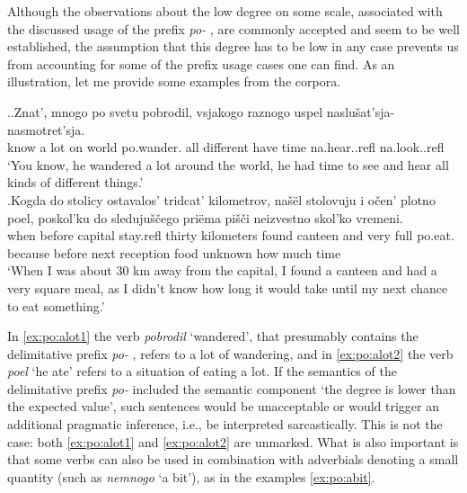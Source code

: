 
Although the observations about the low degree on some scale, associated with the discussed usage of the prefix \textit{po-}  , are commonly accepted and seem to be well established, the assumption that this degree has to be low in any case prevents us from accounting for some of the prefix usage cases one can find. As an illustration, let me provide some examples from the corpora.

\ex.\label{ex:po:alot}\ag.\label{ex:po:alot1}Znat', mnogo po svetu pobrodil, vsjakogo raznogo uspel {naslu\v{s}at'sja-} {nasmotret'sja.}\\
know {a lot} on world po.wander. all different {have time} na.hear..refl na.look..refl\\
\trans `You know, he wandered a lot around the world, he had time to see and hear all kinds of different things.'\\
\bg.\label{ex:po:alot2}Kogda do stolicy ostavalos' tridcat' kilometrov, na\v{s}\"{e}l stolovuju i o\v{c}en' plotno poel, poskol'ku do sleduju\v{s}\v{c}ego pri\"{e}ma pi\v{s}\v{c}i neizvestno skol'ko vremeni.\\
when before capital stay.refl thirty kilometers found canteen and very full po.eat. because before next reception food unknown {how much} time\\
\trans `When I was about 30 km away from the capital, I found a canteen and had a very square meal, as I didn't know how long it would take until my next chance to eat something.'\\

In \ref{ex:po:alot1} the verb \textit{pobrodil} `wandered', that presumably contains the delimitative  prefix \textit{po-}  , refers to a lot of wandering, and in \ref{ex:po:alot2} the verb \textit{poel} `he ate' refers to a situation of eating a lot. If the semantics of the delimitative  prefix \textit{po-}   included the semantic component `the degree is lower than the expected value', such sentences would be unacceptable or would trigger an additional pragmatic inference, i.e., be interpreted sarcastically. This is not the case: both \ref{ex:po:alot1} and \ref{ex:po:alot2} are unmarked. What is also important is that some verbs can also be used in combination with adverbials denoting a small quantity (such as \textit{nemnogo} `a bit'), as in the examples \ref{ex:po:abit}.

